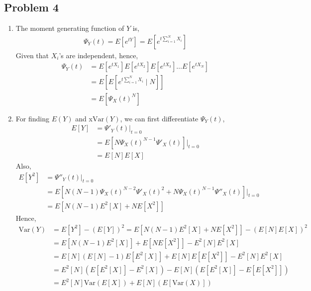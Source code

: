 \documentclass{article}
\begin{document}
	\subsection*{Problem 4}
		\begin{enumerate}
			\item The moment generating function of $Y$ is,
				\begin{align*}
					\Psi_{Y}(t) = E[e^{tY}] = E[e^{t \sum_{i=1}^{N}X_{i}}]
				\end{align*}
				Given that $X_{i}$'s are independent, hence,
				\begin{align*}
					\Psi_{Y}(t) &= E[e^{tX_{1}}]E[e^{tX_{2}}]E[e^{tX_{3}}] \ldots E[e^{tX_{N}}] \\
					&= E[E[e^{t \sum_{i=1}^{N}X_{i}} \mid N]] \\
					&= E[\Psi_{X}(t)^N]
				\end{align*}
			\item For finding $E(Y)$ and x$\mathrm{Var}(Y)$, we can first differentiate $\Psi_{Y}(t)$,
				\begin{align*}
					E[Y] &= \Psi'_{Y}(t) \bigg|_{t=0} \\
					&= E[N \Psi_{X}(t)^{N-1} \Psi'_{X}(t)] \bigg|_{t=0} \\
					&= E[N]E[X]
				\end{align*}
				Also,
				\begin{align*}
					E[Y^2] &= \Psi''_{Y}(t) \bigg|_{t=0} \\
					&= E[N(N-1)\Psi_{X}(t)^{N-2} \Psi'_{X}(t)^2 + N \Psi_{X}(t)^{N-1} \Psi''_{X}(t)] \bigg|_{t=0} \\
					&= E[N(N-1)E^2[X] + NE[X^2]]
				\end{align*}
				Hence,
				\begin{align*}
					\mathrm{Var}(Y) &= E[Y^2] - (E[Y])^2 = E[N(N-1)E^2[X] + NE[X^2]] - (E[N]E[X])^2 \\
					&= E[N(N-1)E^2[X]] + E[NE[X^2]] - E^2[N]E^2[X] \\
					&= E[N](E[N] - 1)E[E^2[X]] + E[N]E[E[X^2]] - E^2[N]E^2[X] \\
					&= E^2[N](E[E^2[X]] - E^2[X]) - E[N](E[E^2[X]] - E[E[X^2]]) \\
					&= E^2[N]\mathrm{Var}(E[X]) + E[N](E[\mathrm{Var}(X)])
				\end{align*}
		\end{enumerate}
\end{document}
